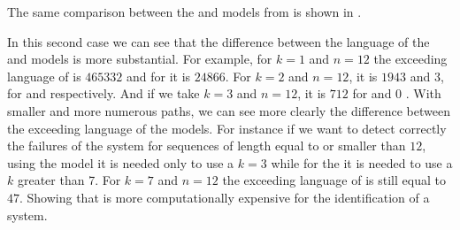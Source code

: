 The same comparison between the \DAOCT{} and \NDAAO{} models from
 is shown in .

In this second case we can see that the difference between the language of the \DAOCT{} and
\NDAAO{} models is more substantial. For example, for $k=1$ and $n=12$ the
exceeding language of \NDAAO{} is $465332$ and for \DAOCT{} it is $24866$. For
$k=2$ and $n=12$, it is $1943$ and $3$, for \NDAAO{} and \DAOCT{} respectively. And
if we take $k=3$ and $n=12$, it is $712$ for \NDAAO{} and $0$ \DAOCT{}. With
smaller and more numerous paths, we can see more clearly the difference between the
exceeding language of the models. For instance if we want to detect correctly
the failures of the system for sequences of length equal to or smaller
than $12$, using the \DAOCT{} model it is needed only to use a $k=3$ while for the
\NDAAO{} it is needed to use a $k$ greater than 7. For $k=7$ and $n=12$ the
exceeding language of \NDAAO{} is still equal to $47$. Showing that \NDAAO{} is more
computationally expensive for the identification of a system.

